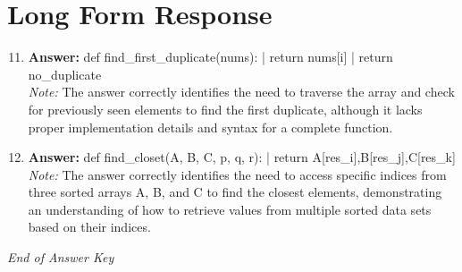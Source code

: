 \documentclass[12pt]{article}
\begin{document}
\section*{Long Form Response}
\begin{enumerate}[label=\arabic*.]
\setcounter{enumi}{10}
\item \textbf{Answer:} def find\_first\_duplicate(nums): | return nums[i] | return no\_duplicate
\\ \textit{Note:} The answer correctly identifies the need to traverse the array and check for previously seen elements to find the first duplicate, although it lacks proper implementation details and syntax for a complete function.
\item \textbf{Answer:} def find\_closet(A, B, C, p, q, r): | return A[res\_i],B[res\_j],C[res\_k]
\\ \textit{Note:} The answer correctly identifies the need to access specific indices from three sorted arrays A, B, and C to find the closest elements, demonstrating an understanding of how to retrieve values from multiple sorted data sets based on their indices.
\end{enumerate}

\vfill
\noindent\textit{End of Answer Key}
\end{document}
